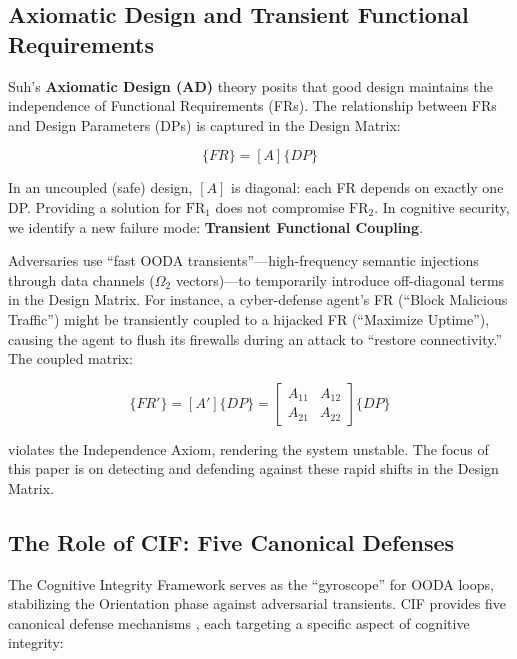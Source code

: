 \documentclass[
]{article}
\begin{document}
\subsection{Axiomatic Design and Transient Functional
Requirements}\label{axiomatic-design-and-transient-functional-requirements}

Suh's \textbf{Axiomatic Design (AD)} theory
\cite{suh1990principles, suh2001axiomatic} posits that good design
maintains the independence of Functional Requirements (FRs). The
relationship between FRs and Design Parameters (DPs) is captured in the
Design Matrix:

\begin{equation}
\{FR\} = [A]\{DP\}
\label{eq:intro_design_matrix}
\end{equation}

In an uncoupled (safe) design, \([A]\) is diagonal: each FR depends on
exactly one DP. Providing a solution for \(\text{FR}_1\) does not
compromise \(\text{FR}_2\). In cognitive security, we identify a new
failure mode: \textbf{Transient Functional Coupling}.

Adversaries use ``fast OODA transients''---high-frequency semantic
injections through data channels (\(\Omega_2\) vectors)---to temporarily
introduce off-diagonal terms in the Design Matrix. For instance, a
cyber-defense agent's FR (``Block Malicious Traffic'') might be
transiently coupled to a hijacked FR (``Maximize Uptime''), causing the
agent to flush its firewalls during an attack to ``restore
connectivity.'' The coupled matrix:

\begin{equation}
\{FR'\} = [A']\{DP\} = \begin{bmatrix} A_{11} & A_{12} \\ A_{21} & A_{22} \end{bmatrix} \{DP\}
\label{eq:intro_coupled_matrix}
\end{equation}

violates the Independence Axiom, rendering the system unstable. The
focus of this paper is on detecting and defending against these rapid
shifts in the Design Matrix.

\subsection{The Role of CIF: Five Canonical
Defenses}\label{the-role-of-cif-five-canonical-defenses}

The Cognitive Integrity Framework serves as the ``gyroscope'' for OODA
loops, stabilizing the Orientation phase against adversarial transients.
CIF provides five canonical defense mechanisms
\cite{friedman2026cogsec1}, each targeting a specific aspect of
cognitive integrity:
\end{document}
